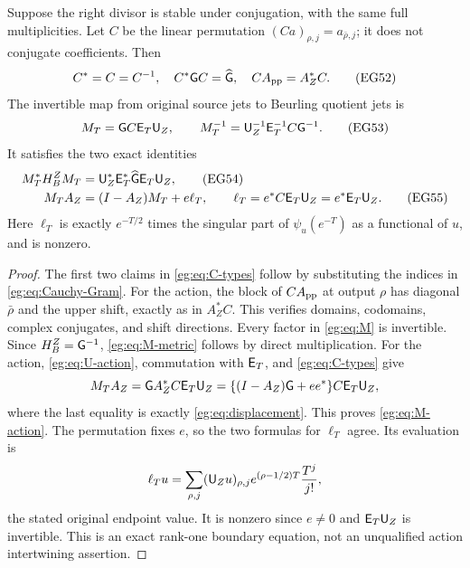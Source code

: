 \documentclass[11pt]{article}
\begin{document}
\begin{egtheorem}
\label{eg:thm:typed-boundary}
Suppose the right divisor is stable under conjugation, with the
same full multiplicities. Let $C$ be the linear permutation
$(Ca)_{\rho,j}=a_{\bar\rho,j}$; it does not conjugate coefficients.
Then
\[
 C^*=C=C^{-1},\quad C^*\mathsf G C=\widehat{\mathsf G},\quad
                         C A_{\rm pp}=A_Z^*C.
 \tag{EG52}\label{eg:eq:C-types}
\]
The invertible map from original source jets to Beurling quotient
jets is
\[
 M_T=\mathsf G C\mathsf E_T\mathsf U_Z,\qquad
 M_T^{-1}=\mathsf U_Z^{-1}\mathsf E_T^{-1}C\mathsf G^{-1}.
 \tag{EG53}\label{eg:eq:M}
\]
It satisfies the two exact identities
\begin{align}
 M_T^*H_B^ZM_T&=\mathsf U_Z^*\mathsf E_T^*\widehat{\mathsf G}\mathsf E_T\mathsf U_Z,
                                  \tag{EG54}\label{eg:eq:M-metric}\\
 M_TA_Z&=(I-A_Z)M_T+e\ell_T,\qquad
 \ell_T=e^*C\mathsf E_T\mathsf U_Z=e^*\mathsf E_T\mathsf U_Z.
                                  \tag{EG55}\label{eg:eq:M-action}
\end{align}
Here $\ell_T$ is exactly $e^{-T/2}$ times the singular part of
$\psi_u(e^{-T})$ as a functional of $u$, and is nonzero.
\end{egtheorem}
\begin{proof}
The first two claims in \eqref{eg:eq:C-types} follow by substituting
the indices in \eqref{eg:eq:Cauchy-Gram}. For the action, the block
of $C A_{\rm pp}$ at output $\rho$ has diagonal $\bar\rho$ and
the upper shift, exactly as in $A_Z^*C$. This verifies domains,
codomains, complex conjugates, and shift directions. Every factor
in \eqref{eg:eq:M} is invertible. Since $H_B^Z=\mathsf G^{-1}$,
\eqref{eg:eq:M-metric} follows by direct multiplication.
For the action, \eqref{eg:eq:U-action}, commutation with $\mathsf E_T$, and
\eqref{eg:eq:C-types} give
\[
 M_TA_Z=\mathsf G A_Z^*C\mathsf E_T\mathsf U_Z
       =\{(I-A_Z)\mathsf G+ee^*\}C\mathsf E_T\mathsf U_Z,
\]
where the last equality is exactly \eqref{eg:eq:displacement}.
This proves \eqref{eg:eq:M-action}. The permutation fixes $e$,
so the two formulas for $\ell_T$ agree. Its evaluation is
\[
 \ell_Tu=\sum_{\rho,j}(\mathsf U_Zu)_{\rho,j}
                e^{(\rho-1/2)T}\frac{T^j}{j!},
\]
the stated original endpoint value. It is nonzero since $e\ne0$
and $\mathsf E_T\mathsf U_Z$ is invertible. This is an exact rank-one boundary
equation, not an unqualified action intertwining assertion.
\end{proof}
\end{document}
